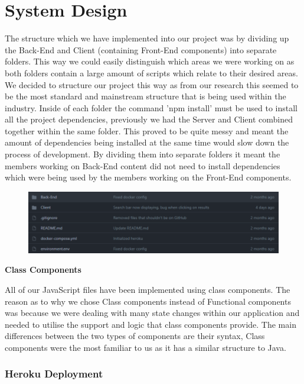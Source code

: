 \chapter{System Design}

The structure which we have implemented into our project was by dividing up the Back-End and Client (containing Front-End components) into separate folders. This way we could easily distinguish which areas we were working on as both folders contain a large amount of scripts which relate to their desired areas. We decided to structure our project this way as from our research this seemed to be the most standard and mainstream structure that is being used within the industry. Inside of each folder the command 'npm install' must be used to install all the project dependencies, previously we had the Server and Client combined together within the same folder. This proved to be quite messy and meant the amount of dependencies being installed at the same time would slow down the process of development. By dividing them into separate folders it meant the members working on Back-End content did not need to install dependencies which were being used by the members working on the Front-End components.

\begin{figure}[H]
  \centering
  \includegraphics[scale=0.65]{img/structure.PNG}
  \label{fig:Project Github Structure}
\end{figure}


\item \textbf{Class Components}

All of our JavaScript files have been implemented using class components. The reason as to why we chose Class components instead of Functional components was because we were dealing with many state changes within our application and needed to utilise the support and logic that class components provide. The main differences between the two types of components are their syntax, Class components were the most familiar to us as it has a similar structure to Java.

\newline

\subsection{Heroku Deployment}

